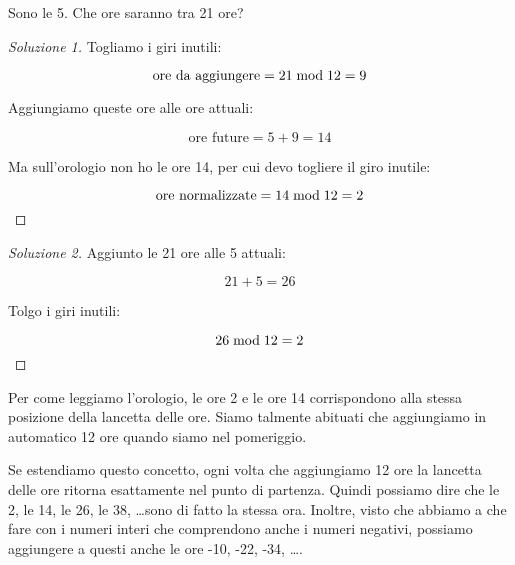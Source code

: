 \begin{mdframed}
    \begin{esercizio}
        Sono le 5. Che ore saranno tra 21 ore?
    \end{esercizio}
    \begin{proof}[Soluzione 1]
        Togliamo i giri inutili:

        \begin{equation*}
            \text{ore da aggiungere} = 21  \bmod  12 = 9
        \end{equation*}

        Aggiungiamo queste ore alle ore attuali:

        \begin{equation*}
            \text{ore future} = 5 + 9 = 14
        \end{equation*}

        Ma sull'orologio non ho le ore 14, per cui devo togliere il giro inutile:

        \begin{equation*}
            \text{ore normalizzate} = 14  \bmod  12 = 2
        \end{equation*}
    \end{proof}
    \begin{proof}[Soluzione 2]
        Aggiunto le 21 ore alle 5 attuali:

        \begin{equation*}
            21 + 5 = 26
        \end{equation*}

        Tolgo i giri inutili:

        \begin{equation*}
            26  \bmod  12 = 2
        \end{equation*}
    \end{proof}
\end{mdframed}

Per come leggiamo l'orologio, le ore 2 e le ore 14 corrispondono alla stessa posizione della lancetta delle ore. Siamo talmente abituati che aggiungiamo in automatico 12 ore quando siamo nel pomeriggio.

Se estendiamo questo concetto, ogni volta che aggiungiamo 12 ore la lancetta delle ore ritorna esattamente nel punto di partenza. Quindi possiamo dire che le 2, le 14, le 26, le 38, \dots sono di fatto la stessa ora. Inoltre, visto che abbiamo a che fare con i numeri interi che comprendono anche i numeri negativi, possiamo aggiungere a questi anche le ore -10, -22, -34, \dots.

